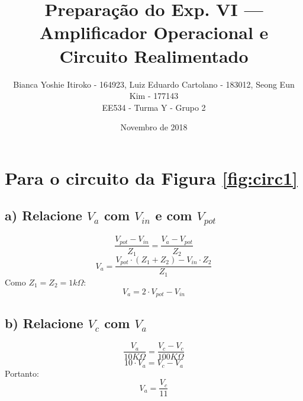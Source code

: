 \documentclass{article}
\begin{document}
    \title{Preparação do Exp. VI — Amplificador Operacional e Circuito Realimentado}
    \author{Bianca Yoshie Itiroko - 164923, Luiz Eduardo Cartolano - 183012, Seong Eun Kim - 177143 \\ EE534 - Turma Y - Grupo 2}
    \date{Novembro de 2018}

    \maketitle

    \section{Para o circuito da Figura \ref{fig:circ1}}
        \subsection{a) Relacione $V_a$ com $V_{in}$ e com $V_{pot}$}
            \begin{equation*}
                \frac{V_{pot} - V_{in}}{Z_1} = \frac{V_a - V_{pot}}{Z_2}
            \end{equation*}
            \begin{equation*}
                V_a = \frac{V_{pot} \cdot (Z_1 + Z_2) - V_{in} \cdot Z_2}{Z_1}
            \end{equation*}
            Como $Z_1=Z_2=1k\Omega$:
            \begin{equation*}
                V_a = 2 \cdot V_{pot} - V_{in}
            \end{equation*}
            
        \subsection{b) Relacione $V_c$ com $V_a$}
            \begin{equation*}
                \frac{V_a}{10K\Omega} = \frac{V_c - V_{c}}{100K\Omega}
            \end{equation*}
            \begin{equation*}
                10 \cdot V_a = V_{c} - V_a
            \end{equation*}
            Portanto:
            \begin{equation*}
                V_a = \frac{V_c}{11}
            \end{equation*}
            
\end{document}
